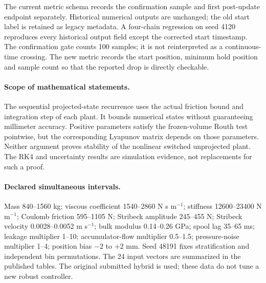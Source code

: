 \documentclass[11pt,a4paper]{article}
\begin{document}
The current metric schema records the confirmation sample and first post-update endpoint separately. Historical numerical outputs are unchanged; the old start label is retained as legacy metadata. A four-chain regression on seed 4120 reproduces every historical output field except the corrected start timestamp. The confirmation gate counts 100 samples; it is not reinterpreted as a continuous-time crossing. The new metric records the start position, minimum hold position and sample count so that the reported drop is directly checkable.

\paragraph{Scope of mathematical statements.} The sequential projected-state recurrence uses the actual friction bound and integration step of each plant. It bounds numerical states without guaranteeing millimeter accuracy. Positive parameters satisfy the frozen-volume Routh test pointwise, but the corresponding Lyapunov matrix depends on those parameters. Neither argument proves stability of the nonlinear switched unprojected plant. The RK4 and uncertainty results are simulation evidence, not replacements for such a proof.

\paragraph{Declared simultaneous intervals.} Mass 840--1560 kg; viscous coefficient 1540--2860 N s m$^{-1}$; stiffness 12600--23400 N m$^{-1}$; Coulomb friction 595--1105 N; Stribeck amplitude 245--455 N; Stribeck velocity 0.0028--0.0052 m s$^{-1}$; bulk modulus 0.14--0.26 GPa; spool lag 35--65 ms; leakage multiplier 1--10; accumulator-flow multiplier 0.5--1.5; pressure-noise multiplier 1--4; position bias $-2$ to $+2$ mm. Seed 48191 fixes stratification and independent bin permutations. The 24 input vectors are summarized in the published tables. The original submitted hybrid is used; these data do not tune a new robust controller.
\end{document}
